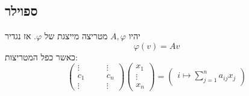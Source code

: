 \documentclass[]{article}
\renewcommand\phi     {\varphi}
\begin{document}
	\subsection{ספוילר}
	יהיו $A, \phi $ מטריצה מייצגת של $\phi$. אז נגדיר
	\[ \phi(v) = Av \]
	כאשר כפל המטריצות: 
	\[ \begin{pmatrix}
		\vdots & \quad & \vdots \\
		c_1 & & c_n \\
		\vdots && \vdots
	\end{pmatrix}\begin{pmatrix}
		x_1 \\ \vdots \\ x_n
	\end{pmatrix} = \begin{pmatrix}
		i \mapsto \sum_{j = 1}^{n}a_{ij}x_j
	\end{pmatrix} \]
	
	
\end{document}
